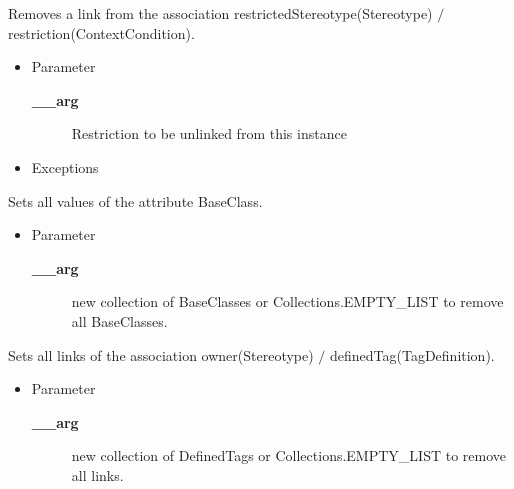 \begin{desc}Removes a link from the association restrictedStereotype(Stereotype)
 $/$ restriction(ContextCondition).
\begin{itemize}
\item{Parameter
  \begin{description}
   \item[{\bf \_\_arg}]{Restriction to be unlinked from this instance}
  \end{description}}
\end{itemize}
\begin{itemize}
\item{{Exceptions}
}
\end{itemize}
\end{desc}

\begin{desc}Sets all values of the attribute BaseClass.
\begin{itemize}
\item{Parameter
  \begin{description}
   \item[{\bf \_\_arg}]{new collection of BaseClasses or Collections.EMPTY\_LIST to
        remove all BaseClasses.}
  \end{description}}
\end{itemize}
\end{desc}

\begin{desc}Sets all links of the association owner(Stereotype)
  $/$ definedTag(TagDefinition).
\begin{itemize}
\item{Parameter
  \begin{description}
   \item[{\bf \_\_arg}]{new collection of DefinedTags or Collections.EMPTY\_LIST to
        remove all links.}
  \end{description}}
\end{itemize}
\end{desc}


